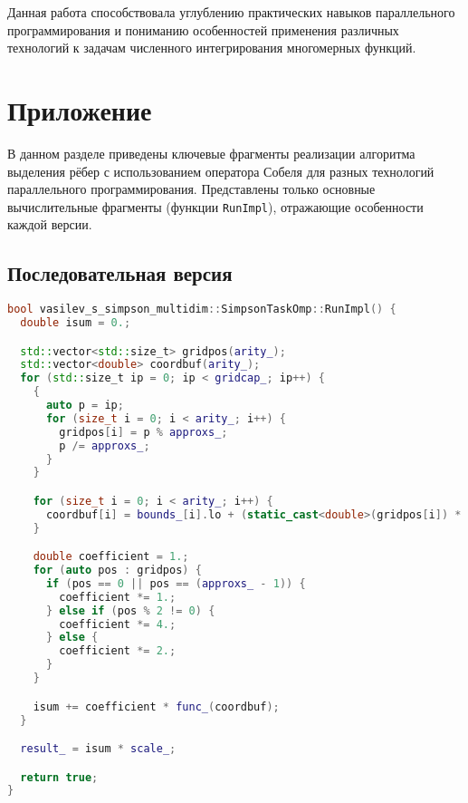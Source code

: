 \documentclass[14pt,a4paper]{extarticle}
\begin{document}
Данная работа способствовала углублению практических навыков параллельного программирования и пониманию особенностей применения различных технологий к задачам численного интегрирования многомерных функций.

\section{Приложение}

В данном разделе приведены ключевые фрагменты реализации алгоритма выделения рёбер с использованием оператора Собеля для разных технологий параллельного программирования. 
Представлены только основные вычислительные фрагменты (функции \texttt{RunImpl}), отражающие особенности каждой версии.

\newpage

\subsection{Последовательная версия}
\begin{lstlisting}[language=C++]
bool vasilev_s_simpson_multidim::SimpsonTaskOmp::RunImpl() {
  double isum = 0.;

  std::vector<std::size_t> gridpos(arity_);
  std::vector<double> coordbuf(arity_);
  for (std::size_t ip = 0; ip < gridcap_; ip++) {
    {
      auto p = ip;
      for (size_t i = 0; i < arity_; i++) {
        gridpos[i] = p % approxs_;
        p /= approxs_;
      }
    }

    for (size_t i = 0; i < arity_; i++) {
      coordbuf[i] = bounds_[i].lo + (static_cast<double>(gridpos[i]) * steps_[i]);
    }

    double coefficient = 1.;
    for (auto pos : gridpos) {
      if (pos == 0 || pos == (approxs_ - 1)) {
        coefficient *= 1.;
      } else if (pos % 2 != 0) {
        coefficient *= 4.;
      } else {
        coefficient *= 2.;
      }
    }

    isum += coefficient * func_(coordbuf);
  }

  result_ = isum * scale_;

  return true;
}
\end{lstlisting}

\newpage
\end{document}
